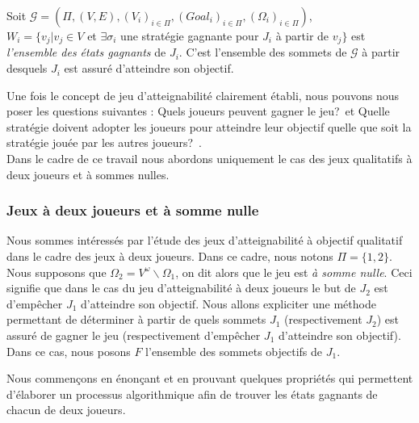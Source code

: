 	
	\begin{defi}
		Soit $\mathcal{G} = (\Pi,(V,E),(V_{i})_{i \in \Pi}, (Goal_{i})_{i \in \Pi},(\Omega _{i})_{i \in \Pi})$,\\
		$W_{i} = \{ v_{j} |v_j \in V$ et $\exists \sigma _{i}$ une stratégie gagnante pour $J_{i}$ à partir de $v_{j}\}$ est \textit{l'ensemble des états gagnants} de $J_{i}$. C'est l'ensemble des sommets de $\mathcal{G}$ à partir desquels $J_{i}$ est assuré d'atteindre son objectif.
	\end{defi}
	
	
	
	Une fois le concept de jeu d'atteignabilité clairement établi, nous pouvons nous poser les questions suivantes : \og Quels joueurs peuvent gagner le jeu?\fg~et \og Quelle stratégie doivent adopter les joueurs pour atteindre leur objectif quelle que soit la stratégie jouée par les autres joueurs?\fg~. \\
	
Dans le cadre de ce travail nous abordons uniquement le cas des jeux qualitatifs à deux joueurs et à sommes nulles.
	
	
	\subsubsection*{Jeux à deux joueurs et à somme nulle}
	Nous sommes intéressés par l'étude des jeux d'atteignabilité à objectif qualitatif dans le cadre des jeux à deux joueurs. Dans ce cadre, nous notons $\Pi = \{ 1,2\}$. Nous supposons que $\Omega _{2} = V^{\omega}\backslash \Omega _{1}$, on dit alors que le jeu est \textit{à somme nulle}. Ceci signifie que dans le cas du jeu d'atteignabilité à deux joueurs le but de $J_{2}$ est d'empêcher $J_{1}$ d'atteindre son objectif. Nous allons expliciter une méthode permettant de déterminer à partir de quels sommets $J_{1}$ (respectivement $J_{2}$) est assuré de gagner le jeu (respectivement d'empêcher $J_{1}$ d'atteindre son objectif). Dans ce cas, nous posons $F$ l'ensemble des sommets objectifs de $J_{1}$.
	
	Nous commençons en énonçant et en prouvant quelques propriétés qui permettent d'élaborer un processus algorithmique afin de trouver les états gagnants de chacun de deux joueurs.
	
